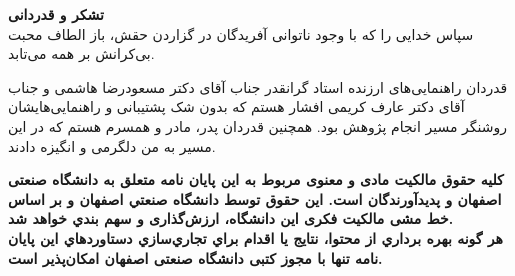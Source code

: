 \documentclass[a4paper,fleqn]{report}
\begin{document}
\restoregeometry
\pagebreak

\thispagestyle{empty}
\vspace*{1.5cm}

{\large
	\textbf{تشکر و قدردانی}\\
	
	
	سپاس خدایی را که با وجود ناتوانی آفریدگان در گزاردن حقش، باز الطاف محبت بی‌کرانش بر همه می‌تابد.
	
	قدردان راهنمایی‌های ارزنده استاد گرانقدر جناب آقای دکتر مسعودرضا هاشمی و جناب آقای دکتر عارف کریمی افشار هستم که بدون شک پشتیبانی و راهنمایی‌هایشان روشنگر مسیر انجام پژوهش بود.
	همچنین قدردان پدر، مادر و همسرم هستم که در این مسیر به من دلگرمی و انگیزه دادند.
	
}
\restoregeometry
\pagebreak

%
%		
%		

\thispagestyle{empty}

\vspace*{3cm}
\textbf{\Large کلیه حقوق مالکیت مادی و معنوی مربوط به اين پايان نامه متعلق به دانشگاه صنعتی اصفهان و پدیدآورندگان است. این حقوق توسط دانشگاه صنعتي اصفهان و بر اساس خط مشی مالکیت فکری این دانشگاه، ارزش‌گذاری و سهم بندي خواهد شد.
\\
			هر گونه بهره برداري از محتوا، نتايج یا اقدام براي تجاري‌سازي دستاوردهاي اين پايان نامه تنها با مجوز کتبی دانشگاه صنعتی اصفهان امکان‌پذیر است.
}
\end{document}
